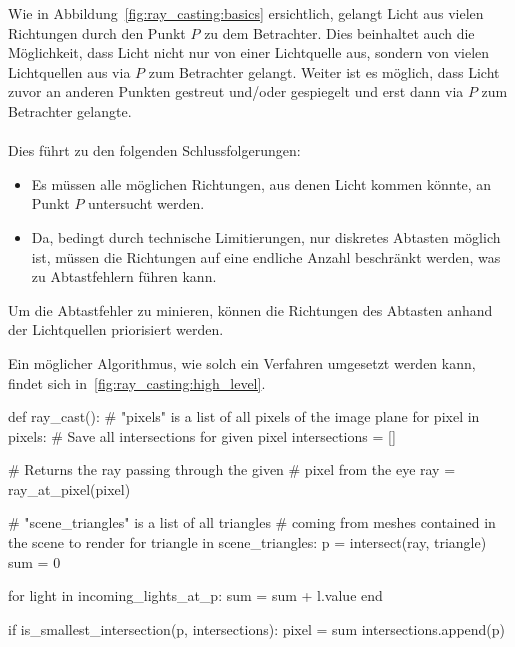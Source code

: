 Wie in Abbildung~\ref{fig:ray_casting:basics} ersichtlich, gelangt Licht aus vielen Richtungen durch den Punkt $P$ zu dem Betrachter. Dies beinhaltet auch die Möglichkeit, dass
Licht nicht nur von einer Lichtquelle aus, sondern von vielen Lichtquellen aus via $P$ zum Betrachter gelangt. Weiter ist es möglich, dass Licht zuvor an anderen Punkten gestreut
und/oder gespiegelt und erst dann via $P$ zum Betrachter gelangte.\\
\\
Dies führt zu den folgenden Schlussfolgerungen:
\begin{itemize}
    \item Es müssen alle möglichen Richtungen, aus denen Licht kommen könnte,
        an Punkt $P$ untersucht werden.
    \item Da, bedingt durch technische Limitierungen, nur diskretes Abtasten
        möglich ist, müssen die Richtungen auf eine endliche Anzahl beschränkt
        werden, was zu Abtastfehlern führen kann.
\end{itemize}
Um die Abtastfehler zu minieren, können die Richtungen des Abtasten anhand der Lichtquellen priorisiert werden.

\newpage{}

Ein möglicher Algorithmus, wie solch ein Verfahren umgesetzt werden kann,
findet sich in~\ref{fig:ray_casting:high_level}.

\begin{python}[caption={Eine abstrakte Umsetzung des Ray
        Castings\protect\footnotemark}.,label={fig:ray_casting:high_level},captionpos=b]
def ray_cast():
    # "pixels" is a list of all pixels of the image plane
    for pixel in pixels:
        # Save all intersections for given pixel
        intersections = []

        # Returns the ray passing through the given
        # pixel from the eye
        ray = ray_at_pixel(pixel)

        # "scene_triangles" is a list of all triangles
        # coming from meshes contained in the scene to render
        for triangle in scene_triangles:
            p   = intersect(ray, triangle)
            sum = 0

            for light in incoming_lights_at_p:
                sum = sum + l.value
            end

            if is_smallest_intersection(p, intersections):
                pixel = sum
            intersections.append(p)
\end{python}


